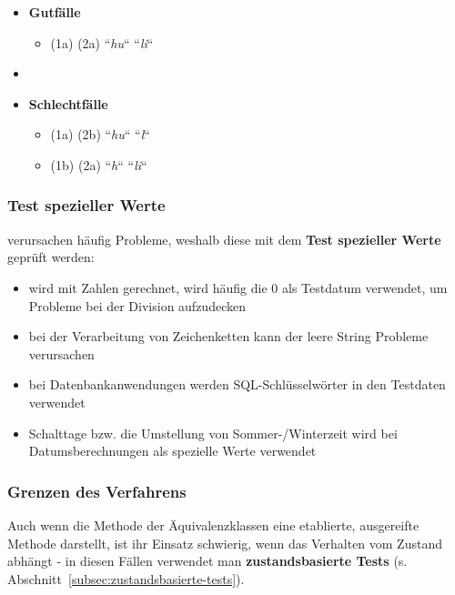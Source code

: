 \begin{itemize}
    \item \textbf{Gutfälle}
    \begin{itemize}
        \item[] (1a) (2a) ``\textit{hu}`` ``\textit{li}``
    \end{itemize}
    \item \item \textbf{Schlechtfälle}
    \begin{itemize}
        \item[] (1a) (2b) ``\textit{hu}`` ``\textit{l}``
        \item[] (1b) (2a) ``\textit{h}`` ``\textit{li}``
    \end{itemize}
\end{itemize}

\subsubsection*{Test spezieller Werte}
 verursachen häufig Probleme, weshalb diese mit dem \textbf{Test spezieller Werte} geprüft werden:

\begin{itemize}
    \item wird mit Zahlen gerechnet, wird häufig die $0$ als Testdatum verwendet, um Probleme bei der Division aufzudecken
    \item bei der Verarbeitung von Zeichenketten kann der leere String  Probleme verursachen
    \item bei Datenbankanwendungen werden SQL-Schlüsselwörter in den Testdaten verwendet
    \item Schalttage bzw. die Umstellung von Sommer-/Winterzeit wird bei Datumsberechnungen als spezielle Werte verwendet
\end{itemize}

\subsubsection*{Grenzen des Verfahrens}
Auch wenn die Methode der Äquivalenzklassen eine etablierte, ausgereifte Methode darstellt, ist ihr Einsatz schwierig, wenn das Verhalten vom Zustand abhängt - in diesen Fällen verwendet man \textbf{zustandsbasierte Tests} (s. Abschnitt~\ref{subsec:zustandsbasierte-tests}).

